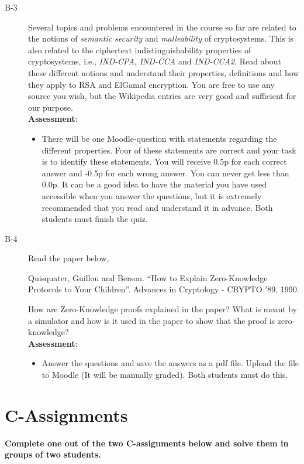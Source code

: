 \documentclass{article}
\begin{document}
\begin{description}
	\item[B-3]{Several topics and problems encountered in the course so far are related to the notions of \textit{semantic security} and \textit{malleability} of cryptosystems. This is also related to the ciphertext indistinguishability properties of cryptosystems, i.e., \textit{IND-CPA}, \textit{IND-CCA} and \textit{IND-CCA2}. Read about these different notions and understand their properties, definitions and how they apply to RSA and ElGamal encryption. You are free to use any source you wish, but the Wikipedia entries are very good and sufficient for our purpose.\\
	\textbf{Assessment}:
	\begin{itemize}
		\item There will be one Moodle-question with statements regarding the different properties. Four of these statements are correct and your task is to identify these statements. You will receive 0.5p for each correct answer and -0.5p for each wrong answer. You can never get less than 0.0p. It can be a good idea to have the material you have used accessible when you answer the questions, but it is extremely recommended that you read and understand it in advance. Both students must finish the quiz.
	\end{itemize}}
	
    \item[B-4]{Read the paper below,
\begin{center}
\begin{minipage}{0.8\textwidth}
Quisquater, Guillou and Berson. ``How to Explain Zero-Knowledge Protocols to Your Children''. Advances in Cryptology - CRYPTO '89, 1990.
\end{minipage}
\end{center}
How are Zero-Knowledge proofs explained in the paper? What is meant by a simulator and how is it used in the paper to show that the proof is zero-knowledge?\\
\textbf{Assessment}:
		\begin{itemize}
			\item Answer the questions and save the answers as a pdf file. Upload the file to Moodle (It will be manually graded). Both students must do this.
		\end{itemize}

}

\end{description}

\clearpage

\section*{C-Assignments}
\textbf{Complete one out of the two C-assignments below and solve them in groups of two students.}
\end{document}
